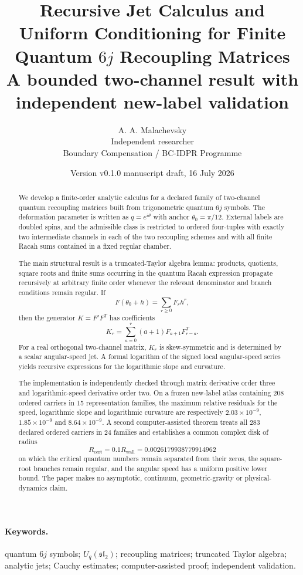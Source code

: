 \documentclass[11pt]{article}
\title{Recursive Jet Calculus and Uniform Conditioning for Finite Quantum $6j$ Recoupling Matrices\\
\large A bounded two-channel result with independent new-label validation}
\author{A. A. Malachevsky\\
Independent researcher\\
Boundary Compensation / BC-IDPR Programme}
\date{Version v0.1.0 manuscript draft, 16 July 2026}
\begin{document}
\maketitle

\begin{abstract}
We develop a finite-order analytic calculus for a declared family of two-channel quantum recoupling matrices built from trigonometric quantum $6j$ symbols.  The deformation parameter is written as $q=e^{i\theta}$ with anchor $\theta_0=\pi/12$.  External labels are doubled spins, and the admissible class is restricted to ordered four-tuples with exactly two intermediate channels in each of the two recoupling schemes and with all finite Racah sums contained in a fixed regular chamber.

The main structural result is a truncated-Taylor algebra lemma: products, quotients, square roots and finite sums occurring in the quantum Racah expression propagate recursively at arbitrary finite order whenever the relevant denominator and branch conditions remain regular.  If
\[
F(\theta_0+h)=\sum_{r\ge0}F_r h^r,
\]
then the generator $K=F'F^T$ has coefficients
\[
K_r=\sum_{a=0}^{r}(a+1)F_{a+1}F_{r-a}^{T}.
\]
For a real orthogonal two-channel matrix, $K_r$ is skew-symmetric and is determined by a scalar angular-speed jet.  A formal logarithm of the signed local angular-speed series yields recursive expressions for the logarithmic slope and curvature.

The implementation is independently checked through matrix derivative order three and logarithmic-speed derivative order two.  On a frozen new-label atlas containing 208 ordered carriers in 15 representation families, the maximum relative residuals for the speed, logarithmic slope and logarithmic curvature are respectively $2.03\times10^{-9}$, $1.85\times10^{-9}$ and $8.64\times10^{-9}$.  A second computer-assisted theorem treats all 283 declared ordered carriers in 24 families and establishes a common complex disk of radius
\[
R_{\mathrm{cert}}=0.1R_{\mathrm{wall}}=0.0026179938779914962
\]
on which the critical quantum numbers remain separated from their zeros, the square-root branches remain regular, and the angular speed has a uniform positive lower bound.  The paper makes no asymptotic, continuum, geometric-gravity or physical-dynamics claim.
\end{abstract}

\paragraph{Keywords.}
quantum $6j$ symbols; $U_q(\mathfrak{sl}_2)$; recoupling matrices; truncated Taylor algebra; analytic jets; Cauchy estimates; computer-assisted proof; independent validation.
\end{document}
